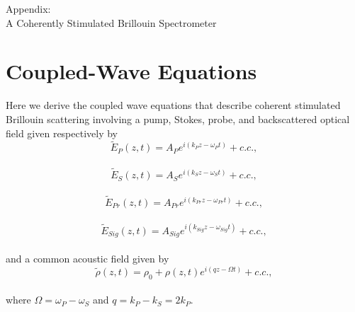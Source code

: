 \documentclass[%
  reprint,
  superscriptaddress,
  amsmath,amssymb,
  aps,
  prapplied,
]{revtex4-2}
\begin{document}
\begin{acknowledgments}

\end{acknowledgments}

\clearpage %
\onecolumngrid %

\begin{titlepage}
\centering
{}
{\Large Appendix:\\[10pt] A Coherently Stimulated Brillouin Spectrometer\par}
\end{titlepage}

\clearpage
\onecolumngrid
\clearpage

\appendix

\section{Coupled-Wave Equations}
\label{Appendix:Coupled-Wave Equations}

Here we derive the coupled wave equations that describe coherent stimulated Brillouin scattering involving a pump, Stokes, probe, and backscattered optical field given respectively by
\\
\begin{equation}
    \tilde{E}_{P}(z,t) = A_{P}e^{i(k_{P}z - \omega_{P}t)} + c.c.,
    \label{eq:Pump optical field}
\end{equation}
\\
\begin{equation}
    \tilde{E}_{S}(z,t) = A_{S}e^{i(k_{S}z - \omega_{S}t)} + c.c.,
    \label{eq:Stokes optical field}
\end{equation}
\\
\begin{equation}
    \tilde{E}_{Pr}(z,t) = A_{Pr}e^{i(k_{Pr}z - \omega_{Pr}t)} + c.c.,
    \label{eq:Probe optical field}
\end{equation}
\\
\begin{equation}
    \tilde{E}_{Sig}(z,t) = A_{Sig}e^{i(k_{Sig}z - \omega_{Sig}t)} + c.c.,
    \label{eq:Signal optical field}
\end{equation}
\\
\noindent and a common acoustic field given by
\\
\begin{equation}
    \tilde{\rho}(z,t) = \rho_{0} + \rho(z,t)e^{i(qz - \Omega t)} + c.c.,
    \label{eq:acoustic field}
\end{equation}
\\
\noindent where $\Omega = \omega_{P} - \omega_{S}$ and $q = k_{P} - k_{S} = 2k_{P}$.
\end{document}
